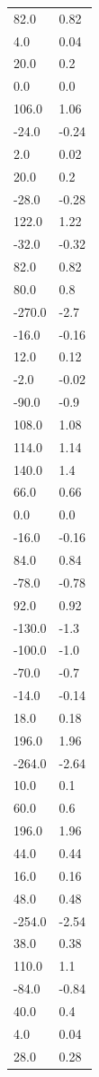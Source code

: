 \begin{longtable}{ll}
82.0 & 0.82 \\
4.0 & 0.04 \\
20.0 & 0.2 \\
0.0 & 0.0 \\
106.0 & 1.06 \\
-24.0 & -0.24 \\
2.0 & 0.02 \\
20.0 & 0.2 \\
-28.0 & -0.28 \\
122.0 & 1.22 \\
-32.0 & -0.32 \\
82.0 & 0.82 \\
80.0 & 0.8 \\
-270.0 & -2.7 \\
-16.0 & -0.16 \\
12.0 & 0.12 \\
-2.0 & -0.02 \\
-90.0 & -0.9 \\
108.0 & 1.08 \\
114.0 & 1.14 \\
140.0 & 1.4 \\
66.0 & 0.66 \\
0.0 & 0.0 \\
-16.0 & -0.16 \\
84.0 & 0.84 \\
-78.0 & -0.78 \\
92.0 & 0.92 \\
-130.0 & -1.3 \\
-100.0 & -1.0 \\
-70.0 & -0.7 \\
-14.0 & -0.14 \\
18.0 & 0.18 \\
196.0 & 1.96 \\
-264.0 & -2.64 \\
10.0 & 0.1 \\
60.0 & 0.6 \\
196.0 & 1.96 \\
44.0 & 0.44 \\
16.0 & 0.16 \\
48.0 & 0.48 \\
-254.0 & -2.54 \\
38.0 & 0.38 \\
110.0 & 1.1 \\
-84.0 & -0.84 \\
40.0 & 0.4 \\
4.0 & 0.04 \\
28.0 & 0.28 \\

\end{longtable}
